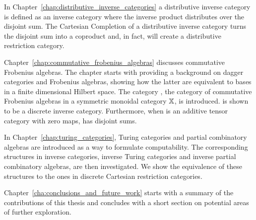 In Chapter~\ref{chap:distributive_inverse_categories}  a distributive inverse category is defined as
an inverse category where the inverse product distributes over the disjoint sum. The Cartesian
Completion of a distributive inverse category turns the disjoint sum into a coproduct and, in fact,
will create a distributive restriction category.

Chapter~\ref{chap:commutative_frobenius_algebras} discusses commutative Frobenius algebras. The
chapter starts with providing a background on dagger categories and Frobenius algebras, showing how
the latter are equivalent to bases in a finite dimensional Hilbert space. The category \CFrob,
the category of commutative Frobenius algebras in a symmetric monoidal category $\mathbb{X}$, is
introduced. \CFrob is shown to be a discrete inverse category. Furthermore, when \X is an
additive tensor category with zero maps, \CFrob has disjoint sums.

In Chapter~\ref{chap:turing_categories}, Turing categories and partial combinatory algebras are
introduced as a way to formulate computability. The corresponding structures in inverse categories,
inverse Turing categories and inverse partial combinatory algebras, are then investigated. We show the
equivalence of these structures to the ones in discrete Cartesian restriction categories.

Chapter~\ref{cha:conclusions_and_future_work} starts with a summary of the contributions of this
thesis and concludes with a short section on potential areas of further exploration.



